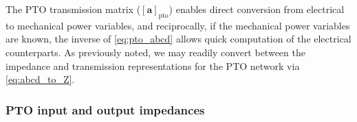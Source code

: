 \documentclass[twocolumn]{autart}
\begin{document}

%
The PTO transmission matrix ($\left[ \mathbf{a} \right]_{\textrm{pto}}$) enables direct conversion from electrical to mechanical power variables, and reciprocally, if the mechanical power variables are known, the inverse of \eqref{eq:pto_abcd} allows quick computation of the electrical counterparts.
As previously noted, we may readily convert between the impedance and transmission representations for the PTO network via \eqref{eq:abcd_to_Z}.


\subsubsection{PTO input and output impedances}\label{sec:pto_input_and_output_impedances}
\end{document}

